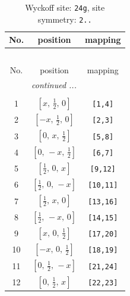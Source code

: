 \documentclass[fleqn,8pt]{jsarticle}
\begin{document}
\renewcommand{\arraystretch}{1.2}
\begin{longtable}{ccc}
\caption{Wyckoff site: {\tt 24g}, site symmetry: {\tt 2..}}
 \\
 \hline \hline
No. & position & mapping \\ \hline \endfirsthead

\multicolumn{2}{l}{\tablename\ \thetable{}} \\
 \hline \hline
No. & position & mapping \\ \hline \endhead

 \hline \hline
\multicolumn{2}{r}{\footnotesize\it continued ...} \\ \endfoot

 \hline \hline
\multicolumn{2}{r}{} \\ \endlastfoot

1 & $\left[ x,\, \frac{1}{2},\, 0 \right]$ & {\tt [1,4]} \\ \hline
2 & $\left[ - x,\, \frac{1}{2},\, 0 \right]$ & {\tt [2,3]} \\ \hline
3 & $\left[ 0,\, x,\, \frac{1}{2} \right]$ & {\tt [5,8]} \\ \hline
4 & $\left[ 0,\, - x,\, \frac{1}{2} \right]$ & {\tt [6,7]} \\ \hline
5 & $\left[ \frac{1}{2},\, 0,\, x \right]$ & {\tt [9,12]} \\ \hline
6 & $\left[ \frac{1}{2},\, 0,\, - x \right]$ & {\tt [10,11]} \\ \hline
7 & $\left[ \frac{1}{2},\, x,\, 0 \right]$ & {\tt [13,16]} \\ \hline
8 & $\left[ \frac{1}{2},\, - x,\, 0 \right]$ & {\tt [14,15]} \\ \hline
9 & $\left[ x,\, 0,\, \frac{1}{2} \right]$ & {\tt [17,20]} \\ \hline
10 & $\left[ - x,\, 0,\, \frac{1}{2} \right]$ & {\tt [18,19]} \\ \hline
11 & $\left[ 0,\, \frac{1}{2},\, - x \right]$ & {\tt [21,24]} \\ \hline
12 & $\left[ 0,\, \frac{1}{2},\, x \right]$ & {\tt [22,23]} \\
\end{longtable}
\renewcommand{\arraystretch}{1.2}
\end{document}
